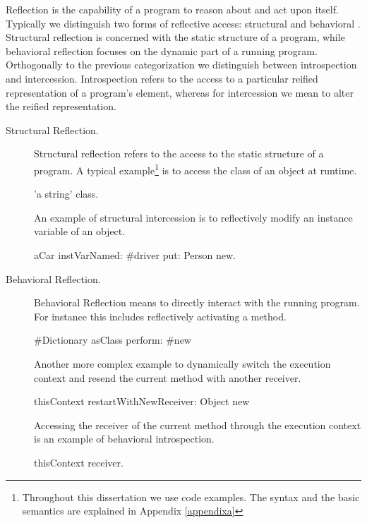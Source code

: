 Reflection is the capability of a program to reason about and act upon itself.
Typically we distinguish two forms of reflective access: structural and behavioral \cite{Maes87a}.
Structural reflection is concerned with the static structure of a program, while behavioral reflection focuses on the dynamic part of a running program.
Orthogonally to the previous categorization we distinguish between introspection and intercession.
Introspection refers to the access to a particular reified representation of a program's element, whereas for intercession we mean to alter the reified representation.

\begin{description}
\item[Structural Reflection.] Structural reflection refers to the access to the static structure of a program.
A typical example\footnote{Throughout this dissertation we use \PH code examples. The syntax and the basic semantics are explained in Appendix \ref{appendixa}} is to access the class of an object at runtime.

\begin{code}
'a string' class.
\end{code}

An example of structural intercession is to reflectively modify an instance variable of an object.

\begin{code}
aCar instVarNamed: #driver put: Person new.
\end{code}

\item[Behavioral Reflection.] Behavioral Reflection means to directly interact with the running program.
For instance this includes reflectively activating a method.

\begin{code}
#Dictionary asClass perform: #new
\end{code}

Another more complex example to dynamically switch the execution context and resend the current method with another receiver.

\begin{code}
thisContext restartWithNewReceiver: Object new 
\end{code}

Accessing the receiver of the current method through the execution context is an example of behavioral introspection.

\begin{code}
thisContext receiver. 
\end{code}
\end{description}

